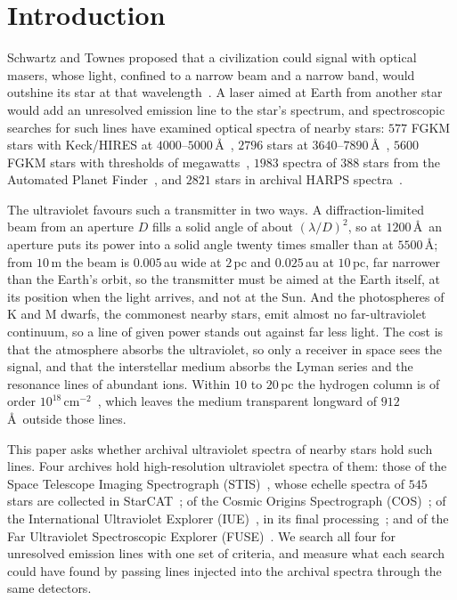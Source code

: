 \documentclass[3p,11pt]{elsarticle}
\begin{document}
\section{Introduction}\label{sec:intro}

Schwartz and Townes proposed that a civilization could signal with optical masers,
whose light, confined to a narrow beam and a narrow band, would outshine its star at
that wavelength~\cite{SchwartzTownes1961}. A laser aimed at Earth from another star
would add an unresolved emission line to the star's spectrum, and spectroscopic searches
for such lines have examined optical spectra of nearby stars: $577$ FGKM stars with
Keck/HIRES at $4000$--$5000$\,\AA~\cite{ReinesMarcy2002}, $2796$ stars at
$3640$--$7890$\,\AA~\cite{TellisMarcy2015}, $5600$ FGKM stars with thresholds of
megawatts~\cite{TellisMarcy2017}, $1983$ spectra of $388$ stars from the Automated
Planet Finder~\cite{Zuckerman2023}, and $2821$ stars in archival HARPS
spectra~\cite{FieldsGoodman2025}.

The ultraviolet favours such a transmitter in two ways. A diffraction-limited beam from
an aperture $D$ fills a solid angle of about $(\lambda/D)^2$, so at $1200$\,\AA\ an
aperture puts its power into a solid angle twenty times smaller than at $5500$\,\AA;
from $10$\,m the beam is $0.005$\,au wide at $2$\,pc and $0.025$\,au at $10$\,pc, far
narrower than the Earth's orbit, so the transmitter must be aimed at the Earth itself,
at its position when the light arrives, and not at the Sun. And
the photospheres of K and M dwarfs, the commonest nearby stars, emit almost no
far-ultraviolet continuum, so a line of given power stands out against far less light.
The cost is that the atmosphere absorbs the ultraviolet, so only a receiver in space sees
the signal, and that the interstellar medium absorbs the Lyman series and the resonance
lines of abundant ions. Within $10$ to $20$\,pc the hydrogen column is of order
$10^{18}$\,cm$^{-2}$~\cite{RedfieldLinsky2008}, which leaves the medium transparent
longward of $912$\,\AA\ outside those lines.

This paper asks whether archival ultraviolet spectra of nearby stars hold such lines.
Four archives hold high-resolution ultraviolet spectra of them: those of the Space
Telescope Imaging Spectrograph (STIS)~\cite{Woodgate1998}, whose echelle spectra of $545$
stars are collected in StarCAT~\cite{Ayres2010}; of the Cosmic Origins Spectrograph
(COS)~\cite{Green2012}; of the International Ultraviolet Explorer
(IUE)~\cite{Boggess1978}, in its final processing~\cite{NicholsLinsky1996}; and of the
Far Ultraviolet Spectroscopic Explorer (FUSE)~\cite{Moos2000,Sahnow2000,Dixon2007}. We
search all four for unresolved emission lines with one set of criteria, and measure what
each search could have found by passing lines injected into the archival spectra through
the same detectors.
\end{document}
